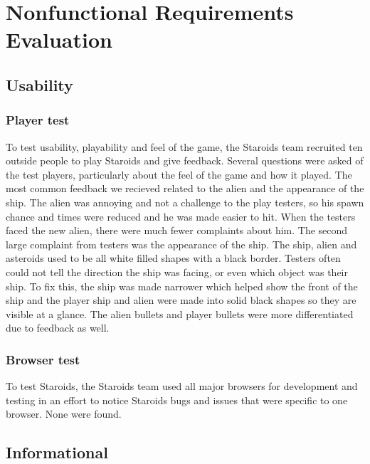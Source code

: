 \documentclass[12pt, titlepage]{article}
\begin{document}


\section{Nonfunctional Requirements Evaluation}

\subsection{Usability}

\subsubsection{Player test}
To test usability, playability and feel of the game, the Staroids team recruited ten outside people to play Staroids and give feedback. Several questions were asked of the test players, particularly about the feel of the game and how it played. The most common feedback we recieved related to the alien and the appearance of the ship. The alien was annoying and not a challenge to the play testers, so his spawn chance and times were reduced and he was made easier to hit. When the testers faced the new alien, there were much fewer complaints about him. The second large complaint from testers was the appearance of the ship. The ship, alien and asteroids used to be all white filled shapes with a black border. Testers often could not tell the direction the ship was facing, or even which object was their ship. To fix this, the ship was made narrower which helped show the front of the ship and the player ship and alien were made into solid black shapes so they are visible at a glance. The alien bullets and player bullets were more differentiated due to feedback as well.\\

\subsubsection{Browser test}
To test Staroids, the Staroids team used all major browsers for development and testing in an effort to notice Staroids bugs and issues that were specific to one browser. None were found.

\subsection{Informational}
\end{document}
